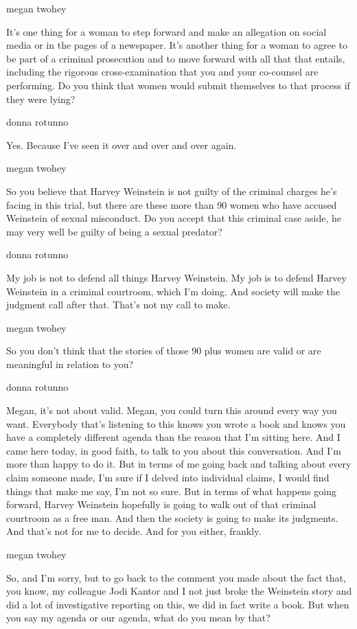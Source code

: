 megan twohey

It's one thing for a woman to step forward and make an allegation on
social media or in the pages of a newspaper. It's another thing for a
woman to agree to be part of a criminal prosecution and to move forward
with all that that entails, including the rigorous cross-examination
that you and your co-counsel are performing. Do you think that women
would submit themselves to that process if they were lying?

donna rotunno

Yes. Because I've seen it over and over and over again.

megan twohey

So you believe that Harvey Weinstein is not guilty of the criminal
charges he's facing in this trial, but there are these more than 90
women who have accused Weinstein of sexual misconduct. Do you accept
that this criminal case aside, he may very well be guilty of being a
sexual predator?

donna rotunno

My job is not to defend all things Harvey Weinstein. My job is to defend
Harvey Weinstein in a criminal courtroom, which I'm doing. And society
will make the judgment call after that. That's not my call to make.

megan twohey

So you don't think that the stories of those 90 plus women are valid or
are meaningful in relation to you?

donna rotunno

Megan, it's not about valid. Megan, you could turn this around every way
you want. Everybody that's listening to this knows you wrote a book and
knows you have a completely different agenda than the reason that I'm
sitting here. And I came here today, in good faith, to talk to you about
this conversation. And I'm more than happy to do it. But in terms of me
going back and talking about every claim someone made, I'm sure if I
delved into individual claims, I would find things that make me say, I'm
not so sure. But in terms of what happens going forward, Harvey
Weinstein hopefully is going to walk out of that criminal courtroom as a
free man. And then the society is going to make its judgments. And
that's not for me to decide. And for you either, frankly.

megan twohey

So, and I'm sorry, but to go back to the comment you made about the fact
that, you know, my colleague Jodi Kantor and I not just broke the
Weinstein story and did a lot of investigative reporting on this, we did
in fact write a book. But when you say my agenda or our agenda, what do
you mean by that?


